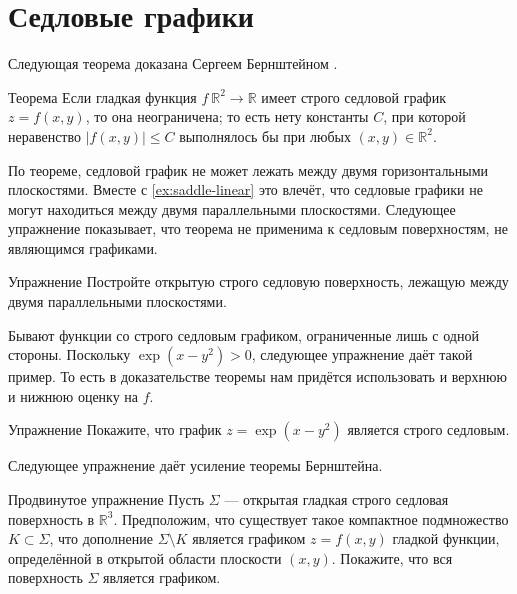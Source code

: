 

\section{Седловые графики}

Следующая теорема доказана Сергеем Бернштейном \cite{bernstein}.

\begin{thm}{Теорема}\label{thm:bernshtein}
Если гладкая функция $f\:\mathbb{R}^2\to\mathbb{R}$ имеет строго седловой график $z=f(x,y)$, то она неограничена;
то есть нету константы $C$, при которой неравенство 
$|f(x,y)|\le C$ выполнялось бы при любых $(x,y)\in\mathbb{R}^2$.
\end{thm}

По теореме, седловой график не может лежать между двумя горизонтальными плоскостями.
Вместе с \ref{ex:saddle-linear} это влечёт, что седловые графики не могут находиться между двумя параллельными плоскостями.
Следующее упражнение показывает, что теорема не применима к седловым поверхностям, не являющимся графиками.

\begin{thm}{Упражнение}\label{ex:between-parallels}
Постройте открытую строго седловую поверхность, лежащую между двумя параллельными плоскостями.
\end{thm}


Бывают функции со строго седловым графиком, ограниченные лишь с одной стороны.
Поскольку $\exp(x-y^2)>0$, следующее упражнение даёт такой пример.
То есть в доказательстве теоремы нам придётся использовать и верхнюю и нижнюю оценку на $f$.

\begin{thm}{Упражнение}\label{ex:one-side-bernshtein}
Покажите, что график
$z=\exp(x-y^2)$
является строго седловым.
\end{thm}

Следующее упражнение даёт усиление теоремы Бернштейна.

\begin{thm}{Продвинутое упражнение}\label{ex:saddle-graph}
Пусть $\Sigma$ --- открытая гладкая строго седловая поверхность в $\mathbb{R}^3$.
Предположим, что существует такое компактное подмножество $K\subset \Sigma$, что дополнение $\Sigma\setminus K$ является графиком $z=f(x,y)$ гладкой функции, определённой в открытой области плоскости $(x,y)$.
Покажите, что вся поверхность $\Sigma$ является графиком.
\end{thm}


